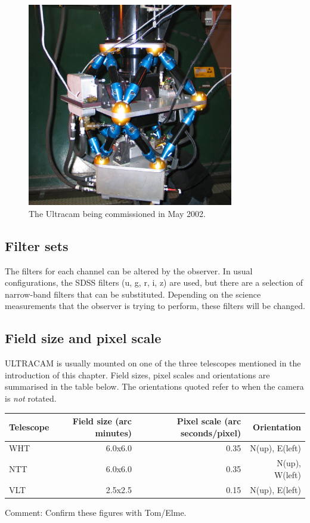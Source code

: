 \begin{figure}[!h]
\centering
\includegraphics[width=90mm]{images/IMG_0121_scaled.JPG}
\caption{The Ultracam being commissioned in May 2002.}
\label{fig1}
\end{figure}

\subsection{Filter sets}
The filters for each channel can be altered by the observer. In usual configurations, the SDSS filters (u, g, r, i, z) are used, but there are a selection of narrow-band filters that can be substituted. Depending on the science measurements that the observer is trying to perform, these filters will be changed.   

\subsection{Field size and pixel scale}
ULTRACAM is usually mounted on one of the three telescopes mentioned in the introduction of this chapter. Field sizes, pixel scales and orientations are summarised in the table below. The orientations quoted refer to when the camera is \emph{not} rotated.

\begin{center}
	\begin{tabular}{|l|r|r|r|}
		\hline
		Telescope & Field size (arc minutes) & Pixel scale (arc seconds/pixel) & Orientation \\
		\hline
		WHT & 6.0x6.0 &  0.35 & N(up), E(left)\\
		NTT & 6.0x6.0 & 0.35 & N(up), W(left)\\
		VLT & 2.5x2.5 & 0.15 & N(up), E(left) \\
		\hline
	\end{tabular}
\end{center}
Comment: Confirm these figures with Tom/Elme.


